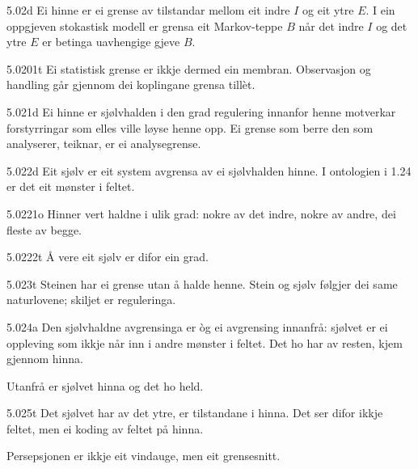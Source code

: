 \begin{formproposition}{5.02}{d}
Ei hinne er ei grense av tilstandar mellom eit indre \(I\) og eit ytre \(E\). I ein oppgjeven stokastisk modell er grensa eit Markov-teppe \(B\) når det indre \(I\) og det ytre \(E\) er betinga uavhengige gjeve \(B\).
\end{formproposition}

\begin{formproposition}{5.0201}{t}
Ei statistisk grense er ikkje dermed ein membran. Observasjon og handling går gjennom dei koplingane grensa tillèt.
\end{formproposition}

\begin{formproposition}{5.021}{d}
Ei hinne er sjølvhalden i den grad regulering innanfor henne motverkar forstyrringar som elles ville løyse henne opp. Ei grense som berre den som analyserer, teiknar, er ei analysegrense.
\end{formproposition}

\begin{formproposition}{5.022}{d}
Eit sjølv er eit system avgrensa av ei sjølvhalden hinne. I ontologien i 1.24 er det eit mønster i feltet.
\end{formproposition}

\begin{formproposition}{5.0221}{o}
Hinner vert haldne i ulik grad: nokre av det indre, nokre av andre, dei fleste av begge.
\end{formproposition}

\begin{formproposition}{5.0222}{t}
Å vere eit sjølv er difor ein grad.
\end{formproposition}

\begin{formproposition}{5.023}{t}
Steinen har ei grense utan å halde henne. Stein og sjølv følgjer dei same naturlovene; skiljet er reguleringa.
\end{formproposition}

\begin{formproposition}{5.024}{a}
Den sjølvhaldne avgrensinga er òg ei avgrensing innanfrå: sjølvet er ei oppleving som ikkje når inn i andre mønster i feltet. Det ho har av resten, kjem gjennom hinna.

Utanfrå er sjølvet hinna og det ho held.
\end{formproposition}

\begin{formproposition}{5.025}{t}
Det sjølvet har av det ytre, er tilstandane i hinna. Det ser difor ikkje feltet, men ei koding av feltet på hinna.

Persepsjonen er ikkje eit vindauge, men eit grensesnitt.
\end{formproposition}

